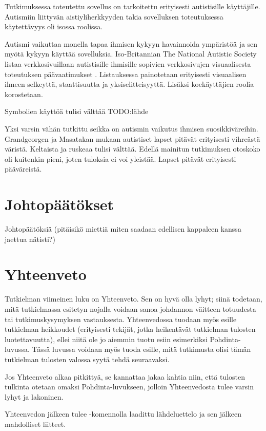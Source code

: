 \documentclass[utf8]{gradu3}
\begin{document}
Tutkimuksessa toteutettu sovellus on tarkoitettu erityisesti autistisille käyttäjille. Autismiin liittyvän aistiyliherkkyyden takia sovelluksen toteutuksessa käytettävyys oli isossa roolissa.

Autismi vaikuttaa monella tapaa ihmisen kykyyn havainnoida ympäristöä ja sen myötä kykyyn käyttää sovelluksia. Iso-Britannian The National Autistic Society listaa verkkosivuillaan autistisille ihmisille sopivien verkkosivujen visuaalisesta toteutuksen päävaatimukset \parencite[]{autism-friendly-websites}. Listauksessa painotetaan erityisesti visuaalisen ilmeen selkeyttä, staattisuutta ja yksiselitteisyyttä. Lisäksi koekäyttäjien roolia korostetaan.

Symbolien käyttöä tulisi välttää TODO:lähde

Yksi varsin vähän tutkittu seikka on autismin vaikutus ihmisen suosikkiväreihin. Grandgeorgen ja Masatakan \parencite[]{color-preference-autism} mukaan autistiset lapset pitävät erityisesti vihreästä väristä. Keltaista ja ruskeaa tulisi välttää. Edellä mainitun tutkimuksen otoskoko oli kuitenkin pieni, joten tuloksia ei voi yleistää. Lapset pitävät erityisesti pääväreistä.

\chapter{Johtopäätökset}

Johtopäätöksiä (pitäisikö miettiä miten saadaan edellisen kappaleen kanssa jaettua nätisti?)

\chapter{Yhteenveto}

Tutkielman viimeinen luku on Yhteenveto.  Sen on hyvä olla lyhyt;
siinä todetaan, mitä tutkielmassa esitetyn nojalla voidaan sanoa
johdannon väitteen totuudesta tai tutkimuskysymyksen vastauksesta.
Yhteenvedossa tuodaan myös esille tutkielman heikkoudet (erityisesti
tekijät, jotka heikentävät tutkielman tulosten luotettavuutta), ellei
niitä ole jo aiemmin tuotu esiin esimerkiksi Pohdinta-luvussa.  Tässä
luvussa voidaan myös tuoda esille, mitä tutkimusta olisi tämän
tutkielman tulosten valossa syytä tehdä seuraavaksi.

Jos Yhteenveto alkaa pitkittyä, se kannattaa jakaa kahtia niin, että
tulosten tulkinta otetaan omaksi Pohdinta-luvukseen, jolloin
Yhteenvedosta tulee varsin lyhyt ja lakoninen.

Yhteenvedon jälkeen tulee \string\printbibliography-komennolla
laadittu lähdeluettelo ja sen jälkeen mahdolliset liitteet.
\end{document}
